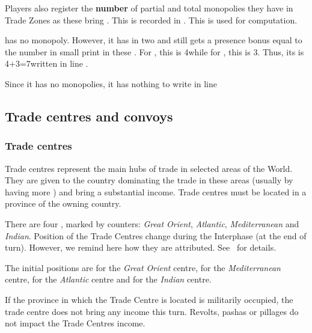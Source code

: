 \aparag Players also register the \textbf{number} of partial and total
monopolies they have in Trade Zones as these bring \VPs. This is
recorded in . This is used
for \VPs computation.

\begin{exemple}
  \POR has no monopoly. However, it has \TradeFLEET in two \STZ and
  still gets a presence bonus equal to the number in small print in
  these \STZ. For , this is 4\ducats while for
  , this is 3\ducats. Thus, its  is 4+3=7\ducats written in line .

  Since it has no monopolies, it has nothing to write in line
\end{exemple}

\subsection{Trade centres and convoys}
\subsubsection{Trade centres}
\aparag Trade centres represent the main hubs of trade in selected areas
of the World. They are given to the country dominating the trade in
these areas (usually by having more \TradeFLEET) and bring a substantial
income. Trade centres must be located in a province of the owning
country.

\aparag There are four , marked by counters:
\emph{Great Orient}, \emph{Atlantic}, \emph{Mediterranean} and
\emph{Indian}.
\bparag Position of the Trade Centres change during the Interphase (at
the end of turn). However, we remind here how they are attributed.
See~ for details.

\aparag The initial positions are \provinceNil for the \emph{Great
  Orient} centre, \provinceVeneto for the \emph{Mediterranean} centre,
\provinceVlaandern for the \emph{Atlantic} centre and \villeDiu for
the \emph{Indian} centre.

\aparag If the province in which the Trade Centre is located is
militarily occupied, the trade centre does not bring any income this
turn.
\bparag Revolts, pashas or pillages do not impact the Trade Centres
income.

